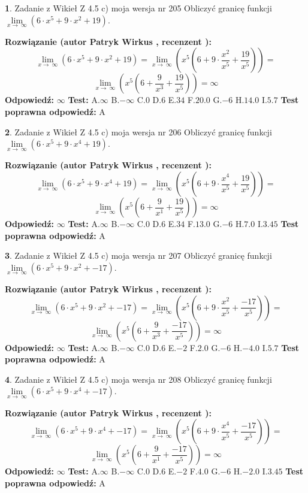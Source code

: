 \documentclass[12pt, a4paper]{article}
\theoremstyle{definition} %
\newtheorem{zad}{}
\newcommand{\zadStart}[1]{\begin{zad}#1\newline}
\newcommand{\zadStop}{\end{zad}}
\newcommand{\rozwStart}[2]{\noindent \textbf{Rozwiązanie (autor #1 , recenzent #2): }\newline}
\newcommand{\rozwStop}{\newline}
\newcommand{\odpStart}{\noindent \textbf{Odpowiedź:}\newline}
\newcommand{\odpStop}{\newline}
\newcommand{\testStart}{\noindent \textbf{Test:}\newline}
\newcommand{\testStop}{\newline}
\newcommand{\kluczStart}{\noindent \textbf{Test poprawna odpowiedź:}\newline}
\newcommand{\kluczStop}{\newline}
\begin{document}
\zadStart{Zadanie z Wikieł Z 4.5 c) moja wersja nr 205}
Obliczyć granicę funkcji  $\lim\limits_{x\to\ \infty}(6 \cdot x^{5}+9 \cdot x^{2}+19)$.
\zadStop
\rozwStart{Patryk Wirkus}{}
$$\lim\limits_{x\to\ \infty}(6 \cdot x^{5}+9 \cdot x^{2}+19) = \lim\limits_{x\to\ \infty}(x^{5}(6 +9 \cdot \frac{x^{2}}{x^{5}}+\frac{19}{x^{5}})) =$$ $$\lim\limits_{x\to\ \infty}(x^{5}(6 +\frac{9}{x^{3}}+\frac{19}{x^{5}})) =\infty$$
\rozwStop
\odpStart
$\infty$
\odpStop
\testStart
A.$\infty$ B.$-\infty$ C.$0$ D.$6$ E.$34$
F.$20.0$ G.$-6$
H.$14.0$
I.$5.7$
\testStop
\kluczStart
A
\kluczStop



\zadStart{Zadanie z Wikieł Z 4.5 c) moja wersja nr 206}
Obliczyć granicę funkcji  $\lim\limits_{x\to\ \infty}(6 \cdot x^{5}+9 \cdot x^{4}+19)$.
\zadStop
\rozwStart{Patryk Wirkus}{}
$$\lim\limits_{x\to\ \infty}(6 \cdot x^{5}+9 \cdot x^{4}+19) = \lim\limits_{x\to\ \infty}(x^{5}(6 +9 \cdot \frac{x^{4}}{x^{5}}+\frac{19}{x^{5}})) =$$ $$\lim\limits_{x\to\ \infty}(x^{5}(6 +\frac{9}{x^{1}}+\frac{19}{x^{5}})) =\infty$$
\rozwStop
\odpStart
$\infty$
\odpStop
\testStart
A.$\infty$ B.$-\infty$ C.$0$ D.$6$ E.$34$
F.$13.0$ G.$-6$
H.$7.0$
I.$3.45$
\testStop
\kluczStart
A
\kluczStop



\zadStart{Zadanie z Wikieł Z 4.5 c) moja wersja nr 207}
Obliczyć granicę funkcji  $\lim\limits_{x\to\ \infty}(6 \cdot x^{5}+9 \cdot x^{2}+-17)$.
\zadStop
\rozwStart{Patryk Wirkus}{}
$$\lim\limits_{x\to\ \infty}(6 \cdot x^{5}+9 \cdot x^{2}+-17) = \lim\limits_{x\to\ \infty}(x^{5}(6 +9 \cdot \frac{x^{2}}{x^{5}}+\frac{-17}{x^{5}})) =$$ $$\lim\limits_{x\to\ \infty}(x^{5}(6 +\frac{9}{x^{3}}+\frac{-17}{x^{5}})) =\infty$$
\rozwStop
\odpStart
$\infty$
\odpStop
\testStart
A.$\infty$ B.$-\infty$ C.$0$ D.$6$ E.$-2$
F.$2.0$ G.$-6$
H.$-4.0$
I.$5.7$
\testStop
\kluczStart
A
\kluczStop



\zadStart{Zadanie z Wikieł Z 4.5 c) moja wersja nr 208}
Obliczyć granicę funkcji  $\lim\limits_{x\to\ \infty}(6 \cdot x^{5}+9 \cdot x^{4}+-17)$.
\zadStop
\rozwStart{Patryk Wirkus}{}
$$\lim\limits_{x\to\ \infty}(6 \cdot x^{5}+9 \cdot x^{4}+-17) = \lim\limits_{x\to\ \infty}(x^{5}(6 +9 \cdot \frac{x^{4}}{x^{5}}+\frac{-17}{x^{5}})) =$$ $$\lim\limits_{x\to\ \infty}(x^{5}(6 +\frac{9}{x^{1}}+\frac{-17}{x^{5}})) =\infty$$
\rozwStop
\odpStart
$\infty$
\odpStop
\testStart
A.$\infty$ B.$-\infty$ C.$0$ D.$6$ E.$-2$
F.$4.0$ G.$-6$
H.$-2.0$
I.$3.45$
\testStop
\kluczStart
A
\kluczStop
\end{document}
